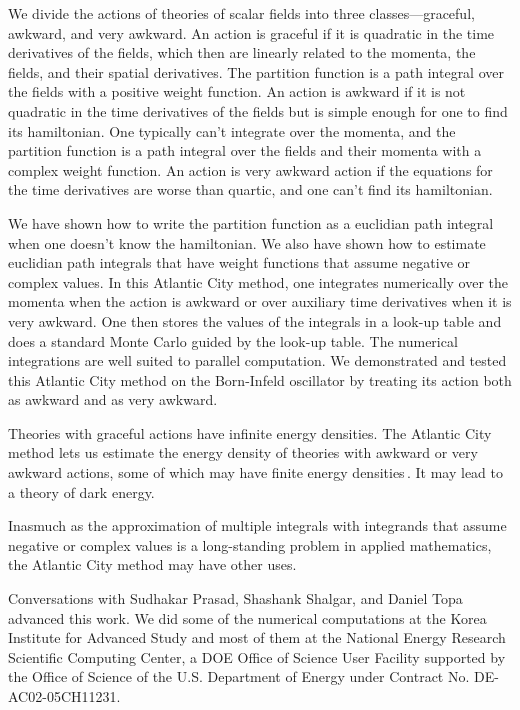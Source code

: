 \documentclass[prd,preprint,floatfix,showpacs]{revtex4-1}
\begin{document}
We divide the actions 
of theories of scalar fields
into three classes---graceful, 
awkward, and very awkward.
An action is graceful if it is quadratic
in the time derivatives of the fields,
which then are 
linearly related to the momenta,
the fields, and
their spatial derivatives.
The partition function is
a path integral over the fields
with a positive weight function.
An action is awkward if it
is not quadratic
in the time derivatives of the fields but is simple
enough for one to find its hamiltonian.
One typically can't integrate over the momenta,
and the partition function is a path integral
over the fields and their momenta
with a complex weight function.
An action is very awkward action if 
the equations for the time derivatives 
are worse than quartic,
and one can't find its hamiltonian.
\par
We have shown how to write 
the partition function as a
euclidian path integral 
when one doesn't know
the hamiltonian.
We also have shown how
to estimate euclidian path integrals
that have weight functions 
that assume negative or complex values.
In this Atlantic City method,
one integrates numerically
over the momenta when the action
is awkward or over
auxiliary time derivatives
when it is very awkward.
One then stores the values of the integrals
in a look-up table
and does a standard 
Monte Carlo guided by
the look-up table. 
The numerical integrations
are well suited to parallel computation.
We demonstrated and tested
this Atlantic City method
on the Born-Infeld oscillator
by treating its action both
as awkward and as very awkward.
\par
Theories with graceful actions
have infinite energy densities. 
The Atlantic City method lets us
estimate the energy density
of theories with awkward
or very awkward 
actions, some of which 
may have finite energy 
densities\,\cite{Bender1990, *Cahill2013NA, 
*PhysRevD.88.125014NA}\@.
It may lead
to a theory of dark energy. 
\par 
Inasmuch as the approximation of multiple
integrals with integrands
that assume negative or complex values
is a long-standing problem 
in applied mathematics,
the Atlantic City method
may have other uses.


\begin{acknowledgments}
Conversations with 
Sudhakar Prasad, Shashank Shalgar,
and Daniel Topa
advanced this work.  
We did some of the
numerical computations at 
the Korea Institute for Advanced Study
and most of them
at the  National Energy Research Scientific Computing Center, a DOE Office of Science User Facility supported by the Office of Science of the U.S. Department of Energy under Contract 
No. DE-AC02-05CH11231.
\end{acknowledgments}
\end{document}
